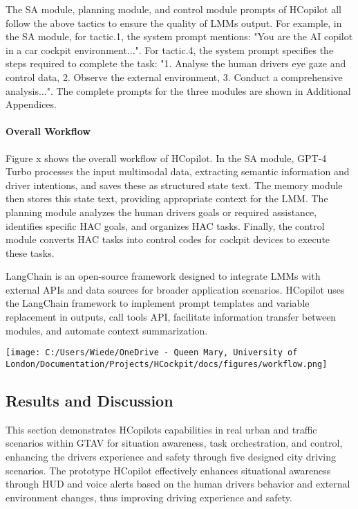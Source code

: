 \documentclass[
]{article}
\begin{document}
The SA module, planning module, and control module prompts of HCopilot
all follow the above tactics to ensure the quality of
LMM\textquotesingle s output. For example, in the SA module, for
tactic.1, the system prompt mentions: "You are the AI copilot in a car
cockpit environment...". For tactic.4, the system prompt specifies the
steps required to complete the task: "1. Analyse the human
driver\textquotesingle s eye gaze and control data, 2. Observe the
external environment, 3. Conduct a comprehensive analysis...". The
complete prompts for the three modules are shown in Additional
Appendices.

\paragraph{Overall Workflow}\label{overall-workflow}

Figure x shows the overall workflow of HCopilot. In the SA module, GPT-4
Turbo processes the input multimodal data, extracting semantic
information and driver intentions, and saves these as structured state
text. The memory module then stores this state text, providing
appropriate context for the LMM. The planning module analyzes the human
driver\textquotesingle s goals or required assistance, identifies
specific HAC goals, and organizes HAC tasks. Finally, the control module
converts HAC tasks into control codes for cockpit devices to execute
these tasks.

LangChain is an open-source framework designed to integrate LMMs with
external APIs and data sources for broader application scenarios.
HCopilot uses the LangChain framework to implement prompt templates and
variable replacement in outputs, call tools API, facilitate information
transfer between modules, and automate context summarization.

\texttt{[image: C:/Users/Wiede/OneDrive - Queen Mary, University of London/Documentation/Projects/HCockpit/docs/figures/workflow.png]}

\subsection{Results and Discussion}\label{results-and-discussion}

This section demonstrates HCopilot\textquotesingle s capabilities in
real urban and traffic scenarios within GTAV for situation awareness,
task orchestration, and control, enhancing the driver\textquotesingle s
experience and safety through five designed city driving scenarios. The
prototype HCopilot effectively enhances situational awareness through
HUD and voice alerts based on the human driver\textquotesingle s
behavior and external environment changes, thus improving driving
experience and safety.
\end{document}
